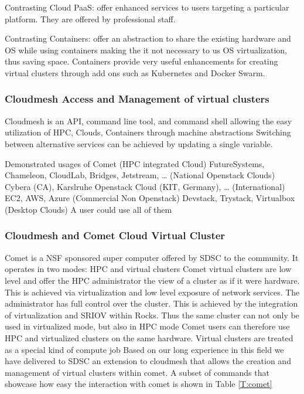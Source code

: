 Contrasting Cloud PaaS: offer enhanced services to users targeting a
particular platform. They are offered by professional staff.

Contrasting Containers: offer an abstraction to share the existing hardware and OS while using containers making the it not necessary to us OS virtualization, thus saving space. Containers provide very useful enhancements for creating virtual clusters through add ons such as Kubernetes and Docker Swarm.



\subsubsection{Cloudmesh Access and Management of virtual clusters}
Cloudmesh is an API, command line tool, and command shell allowing the easy utilization of HPC, Clouds, Containers through machine abstractions
Switching between alternative services can be achieved by updating a
single variable.

Demonstrated usages of
Comet                                                                                           (HPC integrated Cloud)
FutureSystems, Chameleon, CloudLab, Bridges, Jetstream, …  (National Openstack Clouds)
Cybera (CA), Karslruhe Openstack Cloud (KIT, Germany), …     (International)
EC2, AWS, Azure                                                                          (Commercial Non Openstack)
Devstack, Trystack, Virtualbox                                                       (Desktop Clouds)
A user could use all of them

\subsubsection{Cloudmesh and Comet Cloud Virtual Cluster}

Comet is a NSF sponsored super computer offered by SDSC to the
community. It operates in two modes: HPC and virtual clusters Comet
virtual clusters are low level and offer the HPC administrator the
view of a cluster as if it were hardware. This is achieved via
virtualization and low level exposure of network services. The
administrator has full control over the cluster.  This is achieved by
the integration of virtualization and SRIOV within Rocks. Thus the
same cluster can not only be used in virtualized mode, but also in HPC
mode Comet users can therefore use HPC and virtualized clusters on the
same hardware. Virtual clusters are treated as a special kind of
compute job Based on our long experience in this field we have
delivered to SDSC an extension to cloudmesh that allows the creation
and management of virtual clusters within comet. A subset of commands
that showcase how easy the interaction with comet is shown in Table \ref{T:comet}

